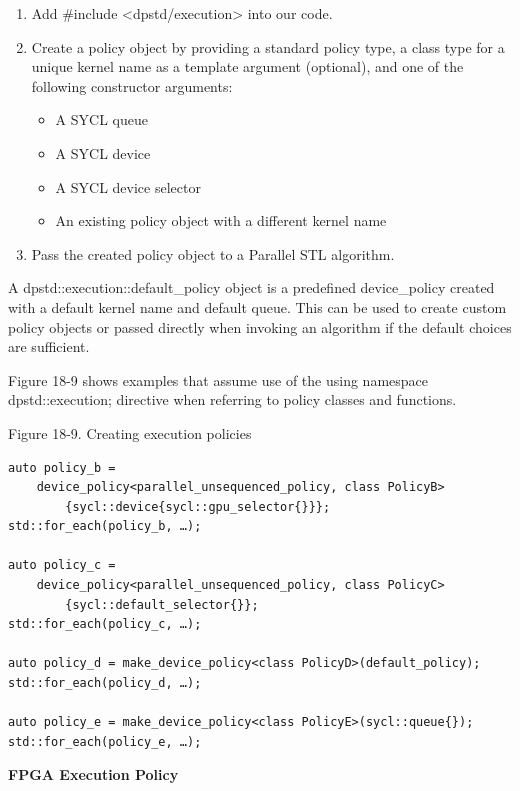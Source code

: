 \begin{enumerate}
	\item Add \#include <dpstd/execution> into our code.
	\item Create a policy object by providing a standard 
	policy type, a class type for a unique kernel name 
	as a template argument (optional), and one of the 
	following constructor arguments:
	\begin{itemize}
		\item A SYCL queue
		\item A SYCL device
		\item A SYCL device selector
		\item An existing policy object with a different kernel 		name
	\end{itemize}
	\item Pass the created policy object to a Parallel STL algorithm.
\end{enumerate}

A dpstd::execution::default\_policy object is a predefined device\_policy created with a default kernel name and default queue. This can be used to create custom policy objects or passed directly when invoking an algorithm if the default choices are sufficient.\par

Figure 18-9 shows examples that assume use of the using namespace dpstd::execution; directive when referring to policy classes and functions.\par

\hspace*{\fill} \par %
Figure 18-9. Creating execution policies
\begin{lstlisting}[caption={}]
auto policy_b = 
	device_policy<parallel_unsequenced_policy, class PolicyB> 
		{sycl::device{sycl::gpu_selector{}}};
std::for_each(policy_b, …);

auto policy_c = 
	device_policy<parallel_unsequenced_policy, class PolicyС> 
		{sycl::default_selector{}};
std::for_each(policy_c, …);

auto policy_d = make_device_policy<class PolicyD>(default_policy);
std::for_each(policy_d, …);

auto policy_e = make_device_policy<class PolicyE>(sycl::queue{});
std::for_each(policy_e, …);
\end{lstlisting}

\hspace*{\fill} \par %
\textbf{FPGA Execution Policy}

